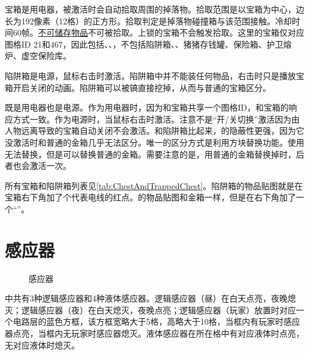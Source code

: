 宝箱是用电器，被激活时会自动拾取周围的掉落物。拾取范围是以宝箱为中心，边长为192像素（12格）的正方形。拾取判定是掉落物碰撞箱与该范围接触。冷却时间60帧。\hyperref[tab:ItemsThatShouldNotBeInInventory]{不可储存物品}不可被拾取。上锁的宝箱不会触发拾取。这里的宝箱仅对应图格ID 21和467，因此包括\DeadMansChest、、，不包括陷阱箱、、猪猪存钱罐、保险箱、护卫熔炉、虚空保险库。

陷阱箱是电源，鼠标右击时激活。陷阱箱中并不能装任何物品，右击时只是播放宝箱开启关闭的动画。陷阱箱可以被镐直接挖掉，从而与普通的宝箱区分。

\DeadMansChest 既是用电器也是电源。作为用电器时，因为和宝箱共享一个图格ID，和宝箱的响应方式一致。作为电源时，当鼠标右击时激活。注意不是“开/关切换”激活因为由人物远离导致的宝箱自动关闭不会激活。和陷阱箱比起来，\DeadMansChest 的隐蔽性更强，因为它没激活时和普通的金箱几乎无法区分。唯一的区分方式是利用方块替换功能。使用\DeadMansChest 无法替换\DeadMansChest，但是可以替换普通的金箱。需要注意的是，用普通的金箱替换掉\DeadMansChest 时，后者也会激活一次。

所有宝箱和陷阱箱列表见\autoref{tab:ChestAndTrappedChest}。陷阱箱的物品贴图就是在宝箱右下角加了个代表电线的红点。\DeadMansChest 的物品贴图和金箱一样，但是在右下角加了一个“”。

\section{感应器}
\begin{figure}[!ht]
  \centering
  \qquad
  \qquad
  \caption{感应器}
\end{figure}
\termTR 中共有3种逻辑感应器和4种液体感应器。逻辑感应器（昼）在白天点亮，夜晚熄灭；逻辑感应器（夜）在白天熄灭，夜晚点亮；逻辑感应器（玩家）放置时对应一个电路层的蓝色方框，该方框宽略大于5格，高略大于10格，当框内有玩家时感应器点亮，当框内无玩家时感应器熄灭。液体感应器在所在格中有对应液体时点亮，无对应液体时熄灭。

